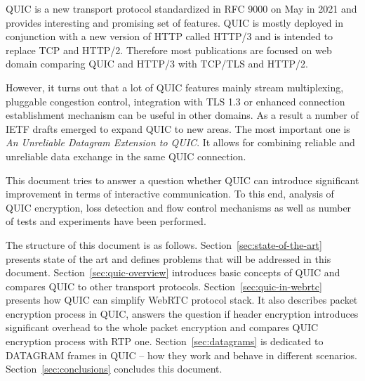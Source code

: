 QUIC is a new transport protocol standardized in RFC 9000 on May in 2021 and provides interesting and promising set of features.
%
QUIC is mostly deployed in conjunction with a new version of HTTP called HTTP/3 and is intended to replace TCP and HTTP/2.
Therefore most publications are focused on web domain comparing QUIC and HTTP/3 with TCP/TLS and HTTP/2.

However, it turns out that a lot of QUIC features mainly stream multiplexing, pluggable congestion control, integration with TLS 1.3
or enhanced connection establishment mechanism can be useful in other domains.
As a result a number of IETF drafts emerged to expand QUIC to new areas.
The most important one is \textit{An Unreliable Datagram Extension to QUIC}.
It allows for combining reliable and unreliable data exchange in the same QUIC connection.

This document tries to answer a question whether QUIC can introduce significant improvement in terms of interactive communication.
To this end, analysis of QUIC encryption, loss detection and flow control mechanisms as well as number of tests and experiments have been performed.

The structure of this document is as follows.
Section~\ref{sec:state-of-the-art} presents state of the art and defines problems that will be addressed in this document.
Section~\ref{sec:quic-overview} introduces basic concepts of QUIC and compares QUIC to other transport protocols.
Section~\ref{sec:quic-in-webrtc} presents how QUIC can simplify WebRTC protocol stack.
It also describes packet encryption process in QUIC, answers the question if header encryption introduces significant overhead to the whole packet encryption and compares QUIC encryption process with RTP one.
Section~\ref{sec:datagrams} is dedicated to DATAGRAM frames in QUIC -- how they work and behave in different scenarios.
Section~\ref{sec:conclusions} concludes this document.
